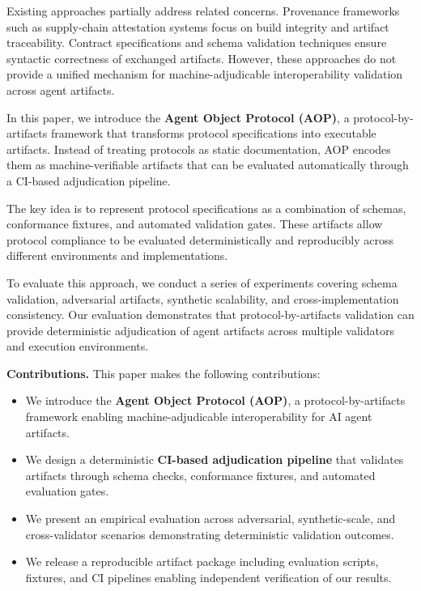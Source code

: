 \documentclass[10pt,conference]{IEEEtran}
\begin{document}
Existing approaches partially address related concerns.
Provenance frameworks such as supply-chain attestation systems focus
on build integrity and artifact traceability.
Contract specifications and schema validation techniques ensure
syntactic correctness of exchanged artifacts.
However, these approaches do not provide a unified mechanism for
machine-adjudicable interoperability validation across agent artifacts.

In this paper, we introduce the \textbf{Agent Object Protocol (AOP)},
a protocol-by-artifacts framework that transforms protocol
specifications into executable artifacts.
Instead of treating protocols as static documentation,
AOP encodes them as machine-verifiable artifacts that can be
evaluated automatically through a CI-based adjudication pipeline.

The key idea is to represent protocol specifications as a combination of
schemas, conformance fixtures, and automated validation gates.
These artifacts allow protocol compliance to be evaluated deterministically
and reproducibly across different environments and implementations.

To evaluate this approach, we conduct a series of experiments
covering schema validation, adversarial artifacts,
synthetic scalability, and cross-implementation consistency.
Our evaluation demonstrates that protocol-by-artifacts validation
can provide deterministic adjudication of agent artifacts across
multiple validators and execution environments.

\textbf{Contributions.}
This paper makes the following contributions:

\begin{itemize}
\item We introduce the \textbf{Agent Object Protocol (AOP)}, a
protocol-by-artifacts framework enabling machine-adjudicable
interoperability for AI agent artifacts.

\item We design a deterministic \textbf{CI-based adjudication pipeline}
that validates artifacts through schema checks, conformance fixtures,
and automated evaluation gates.

\item We present an empirical evaluation across adversarial,
synthetic-scale, and cross-validator scenarios demonstrating
deterministic validation outcomes.

\item We release a reproducible artifact package including
evaluation scripts, fixtures, and CI pipelines enabling
independent verification of our results.
\end{itemize}
\end{document}
